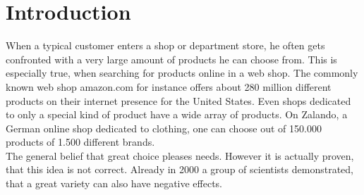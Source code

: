 
\section{Introduction}



When a typical customer enters a shop or department store, he often gets confronted with a very large amount of products he can choose from.
This is especially true, when searching for products online in a web shop.
The commonly known web shop amazon.com for instance offers about 280 million different products on their internet presence for the United States.\citep{marketplaceanalytics:14}
Even shops dedicated to only a special kind of product have a wide array of products.
On Zalando, a German online shop dedicated to clothing, one can choose out of 150.000 products of 1.500 different brands.\citep{visser:14}\\
The general belief that great choice pleases needs.
However it is actually proven, that this idea is not correct.
Already in 2000 a group of scientists demonstrated, that a great variety can also have negative effects.\citep[312]{diehl:2010}







